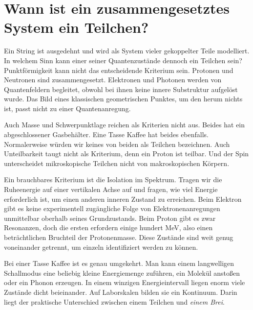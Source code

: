 \begin{classroomqa}
\end{classroomqa}

\section{Wann ist ein zusammengesetztes System ein Teilchen?}

Ein String ist ausgedehnt und wird als System vieler gekoppelter Teile modelliert. In welchem Sinn kann einer seiner Quantenzustände dennoch ein Teilchen sein? Punktförmigkeit kann nicht das entscheidende Kriterium sein. Protonen und Neutronen sind zusammengesetzt. Elektronen und Photonen werden von Quantenfeldern begleitet, obwohl bei ihnen keine innere Substruktur aufgelöst wurde. Das Bild eines klassischen geometrischen Punktes, um den herum nichts ist, passt nicht zu einer Quantenanregung.

Auch Masse und Schwerpunktlage reichen als Kriterien nicht aus. Beides hat ein abgeschlossener Gasbehälter. Eine Tasse Kaffee hat beides ebenfalls. Normalerweise würden wir keines von beiden als Teilchen bezeichnen. Auch Unteilbarkeit taugt nicht als Kriterium, denn ein Proton ist teilbar. Und der Spin unterscheidet mikroskopische Teilchen nicht von makroskopischen Körpern.

Ein brauchbares Kriterium ist die Isolation im Spektrum. Tragen wir die Ruheenergie auf einer vertikalen Achse auf und fragen, wie viel Energie erforderlich ist, um einen anderen inneren Zustand zu erreichen. Beim Elektron gibt es keine experimentell zugängliche Folge von Elektronenanregungen unmittelbar oberhalb seines Grundzustands. Beim Proton gibt es zwar Resonanzen, doch die ersten erfordern einige hundert MeV, also einen beträchtlichen Bruchteil der Protonenmasse. Diese Zustände sind weit genug voneinander getrennt, um einzeln identifiziert werden zu können.

Bei einer Tasse Kaffee ist es genau umgekehrt. Man kann einem langwelligen Schallmodus eine beliebig kleine Energiemenge zuführen, ein Molekül anstoßen oder ein Phonon erzeugen. In einem winzigen Energieintervall liegen enorm viele Zustände dicht beieinander. Auf Laborskalen bilden sie ein Kontinuum. Darin liegt der praktische Unterschied zwischen einem Teilchen und \emph{einem Brei}.


